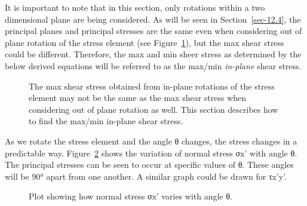 \documentclass[
  letterpaper,
  DIV=11,
  numbers=noendperiod]{scrreprt}
\theoremstyle{definition}
\theoremstyle{remark}
\begin{document}
It is important to note that in this section, only rotations within a
two dimensional plane are being considered. As will be seen in
Section~\ref{sec-12.4}, the principal planes and principal stresses are
the same even when considering out of plane rotation of the stress
element (see Figure~\ref{fig-12.7}), but the max shear stress could be
different. Therefore, the max and min sheer stress as determined by the
below derived equations will be referred to as the max/min
\emph{in-plane} shear stress.

\begin{figure}


\caption{\label{fig-12.7}The max shear stress obtained from in-plane
rotations of the stress element may not be the same as the max shear
stress when considering out of plane rotation as well. This section
describes how to find the max/min in-plane shear stress.}

\end{figure}%

As we rotate the stress element and the angle θ changes, the stress
changes in a predictable way. Figure~\ref{fig-12.8} shows the variation
of normal stress σx' with angle θ. The principal stresses can be seen to
occur at specific values of θ. These angles will be 90° apart from one
another. A similar graph could be drawn for τx'y'.

\begin{figure}


\caption{\label{fig-12.8}Plot showing how normal stress σx' varies with
angle θ.}

\end{figure}%
\end{document}

